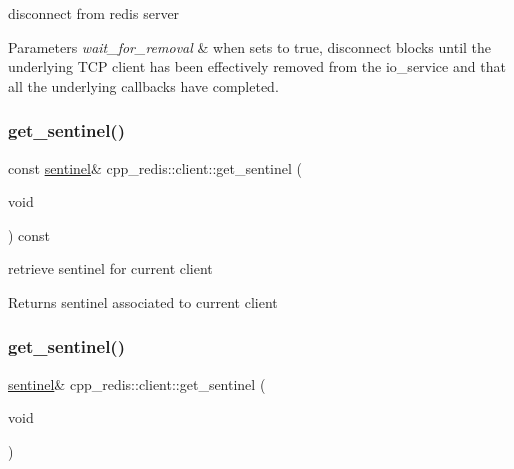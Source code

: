 disconnect from redis server


\begin{DoxyParams}{Parameters}
{\em wait\+\_\+for\+\_\+removal} & when sets to true, disconnect blocks until the underlying T\+CP client has been effectively removed from the io\+\_\+service and that all the underlying callbacks have completed. \\
\hline
\end{DoxyParams}
\mbox{\label{classcpp__redis_1_1client_a9f94860dad26bca4e860a56ca8aefe36}} 
\subsubsection{\texorpdfstring{get\+\_\+sentinel()}{get\_sentinel()}\hspace{0.1cm}{\footnotesize\ttfamily [1/2]}}
{\footnotesize\ttfamily const \hyperlink{classcpp__redis_1_1sentinel}{sentinel}\& cpp\+\_\+redis\+::client\+::get\+\_\+sentinel (\begin{DoxyParamCaption}\item[{void}]{ }\end{DoxyParamCaption}) const}

retrieve sentinel for current client

\begin{DoxyReturn}{Returns}
sentinel associated to current client 
\end{DoxyReturn}
\mbox{\label{classcpp__redis_1_1client_a9457cea98f061ce6071f897ba8605813}} 
\subsubsection{\texorpdfstring{get\+\_\+sentinel()}{get\_sentinel()}\hspace{0.1cm}{\footnotesize\ttfamily [2/2]}}
{\footnotesize\ttfamily \hyperlink{classcpp__redis_1_1sentinel}{sentinel}\& cpp\+\_\+redis\+::client\+::get\+\_\+sentinel (\begin{DoxyParamCaption}\item[{void}]{ }\end{DoxyParamCaption})}

